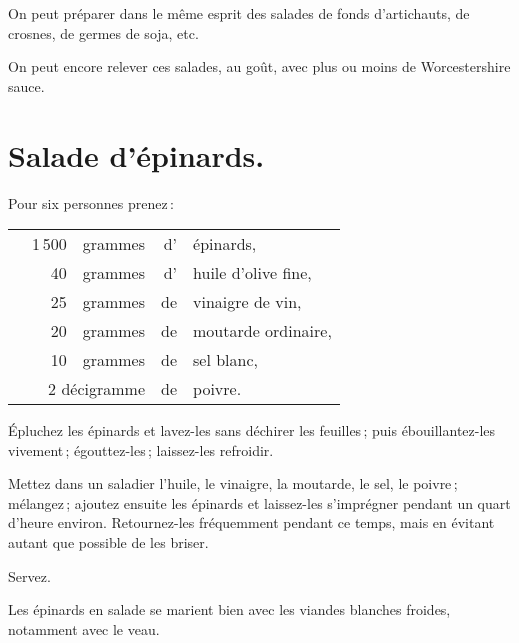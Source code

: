 \sk

On peut préparer dans le même esprit des salades de fonds d'artichauts, de
crosnes, de germes de soja, etc.

\sk

On peut encore relever ces salades, au goût, avec plus ou moins de
Worcestershire sauce.

\section*{\centering Salade d'épinards.}
{}

Pour six personnes prenez :

\footnotesize
\begin{longtable}{rrrrp{16em}}
  &   1 500 & grammes & d' & épinards,                                                                    \\
  &      40 & grammes & d’ & huile d'olive fine,                                                          \\
  &      25 & grammes & de & vinaigre de vin,                                                             \\
  &      20 & grammes & de & moutarde ordinaire,                                                          \\
  &      10 & grammes & de & sel blanc,                                                                   \\
  & \multicolumn{2}{r}{2 décigramme} & de & poivre.                                                       \\
\end{longtable}
\normalsize

Épluchez les épinards et lavez-les sans déchirer les feuilles ; puis
ébouillantez-les vivement ; égouttez-les ; laissez-les refroidir.

Mettez dans un saladier l'huile, le vinaigre, la moutarde, le sel, le poivre ;
mélangez ; ajoutez ensuite les épinards et laissez-les s'imprégner pendant un
quart d'heure environ. Retournez-les fréquemment pendant ce temps, mais en
évitant autant que possible de les briser.

Servez.

\medskip

Les épinards en salade se marient bien avec les viandes blanches froides,
notamment avec le veau.

